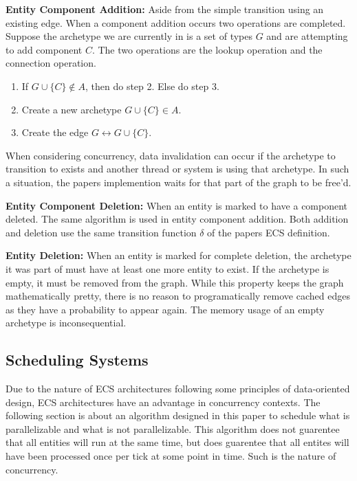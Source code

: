 \textbf{Entity Component Addition: } Aside from the simple transition using an existing edge. When a component addition occurs two operations are completed. Suppose the archetype we are currently in is a set of types $G$ and are attempting to add component $C$. The two operations are the lookup operation and the connection operation.

\begin{enumerate}
    \item If $G \cup \{C\} \not\in A$, then do step 2. Else do step 3.
    \item Create a new archetype $G \cup \{C\} \in A$.
    \item Create the edge $G \leftrightarrow G \cup \{C\}$.
\end{enumerate}

When considering concurrency, data invalidation can occur if the archetype to transition to exists and another thread or system is using that archetype. In such a situation, the papers implemention waits for that part of the graph to be free'd.

\textbf{Entity Component Deletion: } When an entity is marked to have a component deleted. The same algorithm is used in entity component addition. Both addition and deletion use the same transition function $\delta$ of the papers ECS definition.  

\textbf{Entity Deletion: } When an entity is marked for complete deletion, the archetype it was part of must have at least one more entity to exist. If the archetype is empty, it must be removed from the graph. While this property keeps the graph mathematically pretty, there is no reason to programatically remove cached edges as they have a probability to appear again. The memory usage of an empty archetype is inconsequential. 

\subsection{Scheduling Systems}
\label{sec:scheduling}

Due to the nature of ECS architectures following some principles of data-oriented design, ECS architectures have an advantage in concurrency contexts. The following section is about an algorithm designed in this paper to schedule what is parallelizable and what is not parallelizable. This algorithm does not guarentee that all entities will run at the same time, but does guarentee that all entites will have been processed once per tick at some point in time. Such is the nature of concurrency. 

